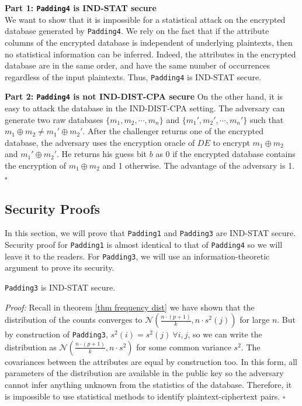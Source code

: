\textbf{Part 1: \texttt{Padding4} is IND-STAT secure} \\
We want to show that it is impossible for a statistical attack on the encrypted database generated by \texttt{Padding4}. We rely on the fact that if the attribute columns of the encrypted database is independent of underlying plaintexts, then no statistical information can be inferred. Indeed, the attributes in the encrypted database are in the same order, and have the same number of occurrences regardless of the input plaintexts. Thus, \texttt{Padding4} is IND-STAT secure.

\textbf{Part 2: \texttt{Padding4} is not IND-DIST-CPA secure}
On the other hand, it is easy to attack the database in the IND-DIST-CPA setting. The adversary can generate two raw databases $\{m_1,m_2, \cdots, m_n\}$ and $\{m_1', m_2', \cdots, m_n'\}$ such that $m_1 \oplus m_2 \neq m_1' \oplus m_2'$. After the challenger returns one of the encrypted database, the adversary uses the encryption oracle of $DE$ to encrypt $m_1 \oplus m_2$ and $m_1' \oplus m_2'$. He returns his guess bit $b$ as 0 if the encrypted database contains the encryption of $m_1 \oplus m_2$ and 1 otherwise. The advantage of the adversary is 1. $\square$




\subsection{Security Proofs}
In this section, we will prove that \texttt{Padding1} and \texttt{Padding3} are IND-STAT secure. Security proof for \texttt{Padding1} is almost identical to that of \texttt{Padding4} so we will leave it to the readers. For \texttt{Padding3}, we will use an information-theoretic argument to prove its security.

\begin{theorem}
	\texttt{Padding3} is IND-STAT secure.
\end{theorem}

\textit{Proof:} Recall in theorem \ref{thm frequency dist} we have shown that the distribution of the counts converges to $\mathcal{N}(\frac{n \cdot (p+1)}{k}, n \cdot s^2(j))$ for large $n$. But by construction of \texttt{Padding3}, $s^2(i) = s^2(j) \ \forall i,j$, so we can write the distribution as $\mathcal{N}(\frac{n \cdot (p+1)}{k}, n \cdot s^2)$ for some common variance $s^2$. The covariances between the attributes are equal by construction too. In this form, all parameters of the distribution are available in the public key so the adversary cannot infer anything unknown from the statistics of the database. Therefore, it is impossible to use statistical methods to identify plaintext-ciphertext pairs. $\square$

